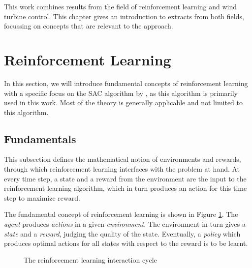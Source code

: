 \label{ch:background}

This work combines results from the field of reinforcement learning and wind turbine control. This chapter gives an introduction to extracts from both fields, focussing on concepts that are relevant to the approach.

\section{Reinforcement Learning}
\label{section:background-reinforcement-learning}
\begin{summary}
In this section, we will introduce fundamental concepts of reinforcement learning with a specific focus on the \ac{SAC} algorithm by \citet{haarnojaSoftActorCriticOffPolicy2018}, as this algorithm is primarily used in this work. Most of the theory is generally applicable and not limited to this algorithm.
\end{summary}

\subsection{Fundamentals}

\begin{summary}
This subsection defines the mathematical notion of environments and rewards, through which reinforcement learning interfaces with the problem at hand. At every time step, a state and a reward from the environment are the input to the reinforcement learning algorithm, which in turn produces an action for this time step to maximize reward. 
\end{summary}

The fundamental concept of reinforcement learning is shown in Figure \ref{fig:rlcycle}. The \textit{agent} produces \textit{actions} in a given \textit{environment}. The environment in turn gives a \textit{state} and a \textit{reward}, judging the quality of the state. Eventually, a \textit{policy} which produces optimal actions for all states with respect to the reward is to be learnt.

\begin{figure}
\centering

  \caption{The reinforcement learning interaction cycle}
  \label{fig:rlcycle}
\end{figure}

